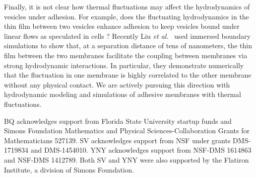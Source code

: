 \documentclass[prf,superscriptaddress,showkeys]{revtex4-1}
\begin{document}
Finally, it is not clear how thermal fluctuations may affect the
hydrodynamics of vesicles under adhesion. For example, does the
fluctuating hydrodynamics in the thin film between two vesicles enhance
adhesion to keep vesicles bound under linear flows as speculated in cells \cite{FenzBihrSchmidt2017_NaturePhys}?  Recently Liu {\em
et al.}~\cite{LiuChuNewbyRead2018_bioRxiv} used immersed boundary
simulations to show that, at a separation distance of tens of
nanometers, the thin film between the two membranes facilitate the
coupling between membranes via strong hydrodynamic interactions. In
particular, they demonstrate numerically that the fluctuation in one
membrane is highly correlated to the other membrane without any physical
contact. We are actively pursuing this direction with hydrodynamic
modeling and simulations of adhesive membranes with thermal fluctuations.

\acknowledgments

BQ acknowledges support from Florida State University startup funds and
Simons Foundation Mathematics and Physical Sciences-Collaboration Grants
for Mathematicians 527139.  SV acknowledges support from NSF under
grants DMS-1719834 and DMS-1454010.  YNY acknowledges support from
NSF-DMS 1614863 and NSF-DMS 1412789.  Both SV and YNY were also supported
by the Flatiron Institute, a division of Simons Foundation.
\end{document}
